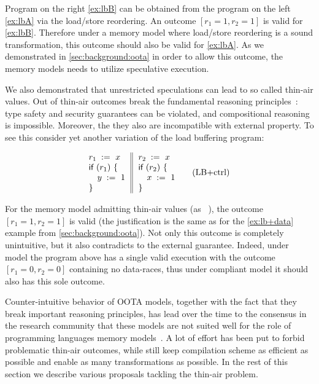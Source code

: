 Program on the right \ref{ex:lbB} can be obtained 
from the program on the left \ref{ex:lbA}
via the load/store reordering.
An outcome ${[r_1=1, r_2=1]}$ is valid for \ref{ex:lbB}.
Therefore under a memory model where load/store reordering 
is a sound transformation, 
this outcome should also be valid for \ref{ex:lbA}.
As we demonstrated in \cref{sec:background:oota}
in order to allow this outcome, 
the memory models needs to utilize speculative execution.

We also demonstrated that unrestricted speculations 
can lead to so called thin-air values. 
Out of thin-air outcomes break the fundamental reasoning 
principles~\cite{Boehm-Demsky:MSPC14, Batty-al:ESOP15}:
type safety and security guarantees can be violated, 
and compositional reasoning is impossible.
Moreover, the they also are incompatible 
with external \DRF property.
To see this consider yet another variation of 
the load buffering program:

\begin{equation*}
\inarrII{
  \readInst{}{r_1}{x}      \\
  \kw{if} {(r_1)} ~\{      \\
  \quad\writeInst{}{y}{1}  \\
  \}
}{
  \readInst{}{r_2}{x}      \\
  \kw{if} {(r_2)} ~\{      \\
  \quad\writeInst{}{x}{1}  \\
  \}
}
\tag{LB+ctrl}\label{ex:lb+ctrl}
\end{equation*}

For the memory model admitting thin-air values 
(as \eg \CMM~\cite{Batty-al:POPL11}), 
the outcome ${[r_1=1, r_2=1]}$ is valid
(the justification is the same as for 
the \ref{ex:lb+data} example from \cref{sec:background:oota}).
Not only this outcome is completely unintuitive,
but it also contradicts to the external \DRF guarantee.
Indeed, under \SC model the program above has 
a single valid execution with the outcome $[r_1=0, r_2=0]$ 
containing no data-races, thus under \DRF compliant model 
it should also has this sole outcome.  

Counter-intuitive behavior of OOTA models, 
together with the fact that they break 
important reasoning principles,
has lead over the time to the consensus in the research community that these models 
are not suited well for the role of 
programming languages memory models~\cite{Boehm-Demsky:MSPC14, Batty-al:ESOP15}.
A lot of effort has been put to forbid problematic 
thin-air outcomes, while still keep compilation scheme as efficient as possible
and enable as many transformations as possible.
In the rest of this section we describe various proposals 
tackling the thin-air problem. 

